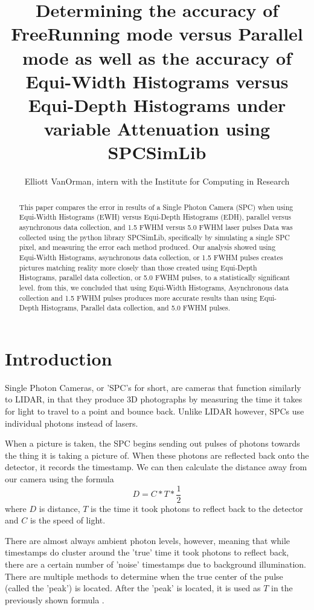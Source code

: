 \documentclass{article}
\title{Determining the accuracy of FreeRunning mode versus Parallel mode as well as the accuracy of Equi-Width Histograms versus Equi-Depth Histograms under variable Attenuation using SPCSimLib \cite{spc}}
\author{Elliott VanOrman, intern with the Institute for Computing in Research}
\begin{document}
\maketitle

\begin{abstract}
This paper compares the error in results of a Single Photon Camera (SPC) when using Equi-Width Histograms (EWH) versus Equi-Depth Histograms (EDH), parallel versus asynchronous data collection, and 1.5 FWHM versus 5.0 FWHM laser pulses
Data was collected using the python library SPCSimLib, specifically by simulating a single SPC pixel, and measuring the error each method produced.
Our analysis showed using Equi-Width Histograms, asynchronous data collection, or 1.5 FWHM pulses creates pictures matching reality more closely than those created using Equi-Depth Histograms, parallel data collection, or 5.0 FWHM pulses, to a statistically significant level.
from this, we concluded that using Equi-Width Histograms, Asynchronous data collection and 1.5 FWHM pulses produces more accurate results than using Equi-Depth Histograms, Parallel data collection, and 5.0 FWHM pulses.
\end{abstract}

\section*{Introduction}

Single Photon Cameras, or 'SPC's for short, are cameras that function similarly to LIDAR, in that they produce 3D photographs by measuring the time it takes for light to travel to a point and bounce back. Unlike LIDAR however, SPCs use individual photons instead of lasers. \cite{ingle} \cite{sadekar}

When a picture is taken, the SPC begins sending out pulses of photons towards the thing it is taking a picture of. When these photons are reflected back onto the detector, it records the timestamp. We can then calculate the distance away from our camera using the formula \[D=C*T*\frac{1}{2}\] where $D$ is distance, $T$ is the time it took photons to reflect back to the detector and $C$ is the speed of light. \cite{sadekar}

There are almost always ambient photon levels, however, meaning that while timestamps do cluster around the 'true' time it took photons to reflect back, there are a certain number of 'noise' timestamps due to background illumination. There are multiple methods to determine when the true center of the pulse (called the 'peak') is located. After the 'peak' is located, it is used as $T$ in the previously shown formula \cite{sadekar}.
\end{document}
